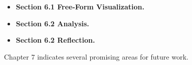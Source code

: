 \begin{itemize}
\item \textbf {Section 6.1 Free-Form Visualization.} 
\item \textbf {Section 6.2 Analysis.} 
\item \textbf {Section 6.2 Reflection.} 
\end{itemize}

Chapter 7 indicates several promising areas for future work. 




%

\vfill

